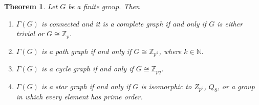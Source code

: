 \documentclass[11pt,twoside]{amsart}
\def \N {{\mathbb{N}}}
\def \Z {{\mathbb{Z}}}
\def \Ga {{\Gamma }}
\newtheorem{theorem}{Theorem}[section]
\begin{document}
\begin{theorem}\label{path}
    Let $G$ be a finite group. Then
    \begin{enumerate}[label={(\arabic*)}]
    \item\label{Thm:part:1} $\Ga(G)$ is connected and it is a complete graph if and only if $G$ is either trivial or $G\cong \Z_p.$
        \item\label{Thm:part:2} $\Ga (G)$ is a path graph if and only if $G\cong \Z_{p^k}$, where $k\in \N.$
        \item\label{Thm:part:3} $\Gamma (G)$ is a cycle graph if and only if $G\cong \Z_{pq}$.
        \item\label{Thm:part:4} $\Gamma (G)$ is a star graph if and only if 
$G$ is isomorphic to $Z_{p^2}$, $Q_8$, or a group in which every element has prime order.
        \end{enumerate}
        \end{theorem}
\end{document}
